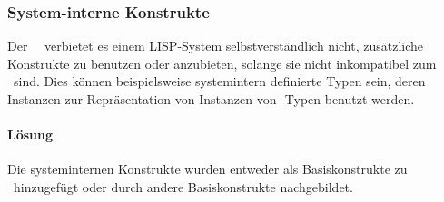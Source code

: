 \subsubsection{System-interne Konstrukte}
%
Der \cl\ \std\ verbietet es einem LISP-System selbstverst\"{a}ndlich
nicht, zu\-s\"{a}tz\-li\-che Konstrukte zu benutzen oder anzubieten,
solange sie nicht inkompatibel zum \std\ sind. Dies k\"{o}n\-nen
beispielsweise systemintern definierte Typen sein, deren Instanzen zur
Re\-pr\"{a}\-sen\-ta\-tion von Instanzen von \std-Typen benutzt werden.
%
\paragraph{L\"{o}sung}
Die systeminternen Konstrukte wurden entweder als Basiskonstrukte zu
\plob\ hinzugef\"{u}gt oder durch andere Basiskonstrukte nachgebildet.
%
